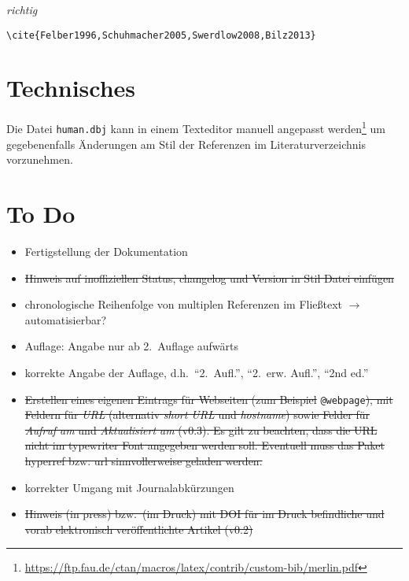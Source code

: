 \documentclass[a4paper,10pt]{scrartcl}
\renewcommand{\cite}{\citep}  %
\begin{document}
\emph{richtig}
\begin{Verbatim}
\cite{Felber1996,Schuhmacher2005,Swerdlow2008,Bilz2013}
\end{Verbatim}
\vspace{-0.8em}
\cite{Felber1996,Schuhmacher2005,Swerdlow2008,Bilz2013} 


\section{Technisches}
Die Datei \verb|human.dbj| kann in einem Texteditor manuell angepasst
werden\footnote{%
\url{https://ftp.fau.de/ctan/macros/latex/contrib/custom-bib/merlin.pdf}} um
gegebenenfalls Änderungen am Stil der Referenzen im Literaturverzeichnis
vorzunehmen.


\section{To Do}
\begin{itemize}
 \item Fertigstellung der Dokumentation
 \item \sout{Hinweis auf inoffiziellen Status, changelog und Version in Stil
Datei
einfügen}
 \item chronologische Reihenfolge von multiplen Referenzen im Fließtext 
       $\rightarrow$ automatisierbar? 
 \item Auflage: Angabe nur ab 2.~Auflage aufwärts
 \item korrekte Angabe der Auflage, d.h.\ "`2.~Aufl."', "`2.~erw. Aufl."', "`2nd
ed."'
 \item \sout{Erstellen eines eigenen Eintrags für Webseiten (zum Beispiel}
\verb|@webpage|\sout{), mit Feldern für \emph{URL} (alternativ \emph{short URL}
und
\emph{hostname}) sowie Felder für \emph{Aufruf am} und
\emph{Aktualisiert am} (v0.3). Es gilt zu
beachten,
dass die URL nicht im typewriter Font angegeben werden soll. Eventuell muss das
Paket hyperref bzw. url sinnvollerweise geladen werden.}
\item korrekter Umgang mit Journalabkürzungen
\item \sout{Hinweis (in press) bzw.\ (im Druck) mit DOI f\"ur im Druck
befindliche und
vorab elektronisch ver\"offentlichte Artikel (v0.2)}
\end{itemize}


\newpage
\label{sec:Literaturverzeichnis}

\nocite{*}

%
\end{document}

